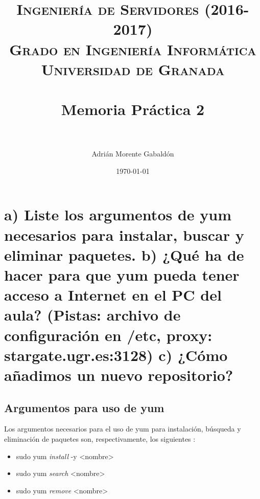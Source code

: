 


\title{
\normalfont \normalsize
\textsc{\textbf{Ingeniería de Servidores (2016-2017)} \\ Grado en Ingeniería Informática \\ Universidad de Granada} \\ [25pt] %
\horrule{0.5pt} \\[0.4cm] %
\huge Memoria Práctica 2 \\ %
\horrule{2pt} \\[0.5cm] %
}

\author{Adrián Morente Gabaldón} %

\date{\normalsize\today} %




\maketitle %

\newpage %

\tableofcontents %

\listoffigures

\listoftables

\newpage


\section{a) Liste los argumentos de yum necesarios para instalar, buscar y eliminar
paquetes. b) ¿Qué ha de hacer para que yum pueda tener acceso a Internet en el PC
del aula? (Pistas: archivo de configuración en /etc, proxy: stargate.ugr.es:3128)
c) ¿Cómo añadimos un nuevo repositorio?}

	\subsection{Argumentos para uso de yum}
	Los argumentos necesarios para el uso de yum para instalación, búsqueda y eliminación de paquetes son, respectivamente, los siguientes \cite{yum-admin}:
	\begin{itemize}
		\item sudo yum \emph{install} -y <nombre>
		\item sudo yum \emph{search} <nombre>
		\item sudo yum \emph{remove} <nombre>
	\end{itemize}

